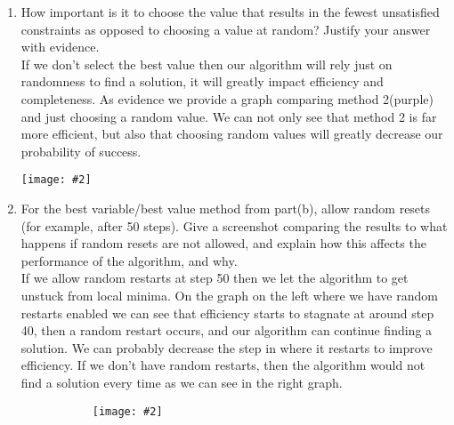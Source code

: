 \documentclass{article}
\def\ans#1{{\color{ans}#1}}
\newcommand{\centerfig}[2]{\begin{center}\texttt{[image: \#2]}\end{center}}
\begin{document}
\begin{enumerate}[label=(\alph*)]
{    }
    \begin{center}
        \begin{figure}[htp]
        \begin{subfigure}[b]{0.5\textwidth} \color{ans}
            \centerfig{1}{../figs/q4_c_1.png}
        \end{subfigure}
        \begin{subfigure}[b]{0.5\textwidth} \color{ans}
            \centerfig{1}{../figs/q4_c_2.png}
        \end{subfigure}
        \end{figure}
    \end{center}
    \item How important is it to choose the value that results in the fewest unsatisfied constraints as opposed to choosing a value at random? Justify your answer with evidence.\\
    \ans{
        If we don’t select the best value then our algorithm will rely just on randomness to find a 
        solution, it will greatly impact efficiency and completeness. As evidence we provide a graph 
        comparing method 2(purple) and just choosing a random value. We can not only see that method 2 
        is far more efficient, but also that choosing random values will greatly decrease our probability 
        of success.
    }
    \centerfig{0.8}{../figs/q4_c_3.png}
    \item For the best variable/best value method from part(b), allow random resets (for example, after 50 steps). Give a screenshot comparing the results to what happens if random resets are not allowed, and explain how this affects the performance of the algorithm, and why.\\
    \ans{
        If we allow random restarts at step 50 then we let the algorithm to get unstuck from local minima. 
        On the graph on the left where we have random restarts enabled we can see that efficiency starts 
        to stagnate at around step 40, then a random restart occurs, and our algorithm can continue 
        finding a solution. We can probably decrease the step in where it restarts to improve efficiency. 
        If we don’t have random restarts, then the algorithm would not find a solution every time as we 
        can see in the right graph.
    }
    \begin{center}
        \begin{figure}[htp]
        \begin{subfigure}[b]{0.5\textwidth} \color{ans}
            \centerfig{1}{../figs/q4_c_4.png}{
}
\end{subfigure}
\end{figure}
\end{center}
\end{enumerate}
\end{document}
